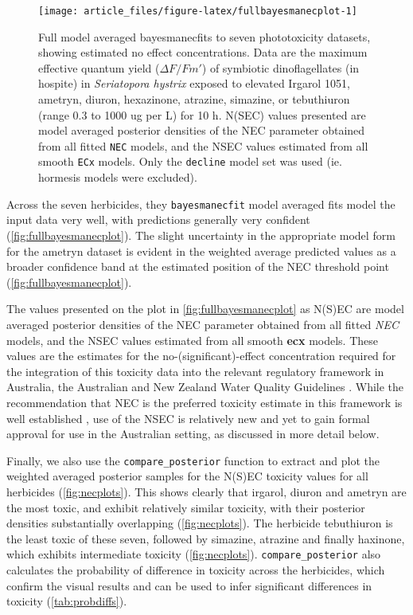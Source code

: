 \documentclass[
  shortnames]{jss}
\begin{document}
\begin{CodeChunk}
\begin{figure}[!ht]

{\centering \texttt{[image: article\_files/figure-latex/fullbayesmanecplot-1]} 

}

\caption{Full model averaged bayesmanecfits to seven phototoxicity datasets, showing estimated no effect concentrations. Data are the maximum effective quantum yield ($\Delta F / Fm'$) of symbiotic dinoflagellates (in hospite) in \textit{Seriatopora hystrix} exposed to elevated Irgarol 1051, ametryn, diuron, hexazinone, atrazine, simazine, or tebuthiuron (range 0.3 to 1000 ug per L) for 10 h. N(SEC) values presented are model averaged posterior densities of the NEC parameter obtained from all fitted \texttt{NEC} models, and the NSEC values estimated from all smooth \texttt{ECx} models. Only the \texttt{decline} model set was used (ie. hormesis models were excluded).}\label{fig:fullbayesmanecplot}
\end{figure}
\end{CodeChunk}

Across the seven herbicides, they \texttt{bayesmanecfit} model averaged fits model the input data very well, with predictions generally very confident (\autoref{fig:fullbayesmanecplot}). The slight uncertainty in the appropriate model form for the ametryn dataset is evident in the weighted average predicted values as a broader confidence band at the estimated position of the NEC threshold point (\autoref{fig:fullbayesmanecplot}).

The values presented on the plot in \autoref{fig:fullbayesmanecplot} as N(S)EC are model averaged posterior densities of the NEC parameter obtained from all fitted \emph{NEC} models, and the NSEC values estimated from all smooth \textbf{ecx} models. These values are the  estimates for the no-(significant)-effect concentration required for the integration of this toxicity data into the relevant regulatory framework in Australia, the Australian and New Zealand Water Quality Guidelines \citep{anzg}. While the recommendation that NEC is the preferred toxicity estimate in this framework is well established \citep[\citet{Warne2018c}]{Warne2015}, use of the NSEC is relatively new \citep{Fisher2022} and yet to gain formal approval for use in the Australian setting, as discussed in more detail below.

Finally, we also use the \texttt{compare\_posterior} function to extract and plot the weighted averaged posterior samples for the N(S)EC toxicity values for all herbicides (\autoref{fig:necplots}). This shows clearly that irgarol, diuron and ametryn are the most toxic, and exhibit relatively similar toxicity, with their posterior densities substantially overlapping (\autoref{fig:necplots}). The herbicide tebuthiuron is the least toxic of these seven, followed by simazine, atrazine and finally haxinone, which exhibits intermediate toxicity (\autoref{fig:necplots}). \texttt{compare\_posterior} also calculates the probability of difference in toxicity across the herbicides, which confirm the visual results and can be used to infer significant differences in toxicity (\autoref{tab:probdiffs}).
\end{document}
